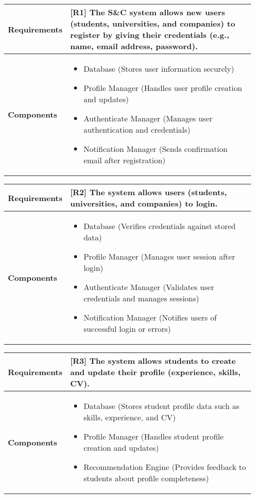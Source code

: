 \begin{table}[h!]
\centering
\begin{tabular}{|l|p{10cm}|}
\hline
\textbf{Requirements} & 
[R1] The S\&C system allows new users (students, universities, and companies) to register by giving
 their credentials (e.g., name, email address, password).\\
\hline
\textbf{Components} & 
\begin{itemize}
    \item Database (Stores user information securely)
    \item Profile Manager (Handles user profile creation and updates)
    \item Authenticate Manager (Manages user authentication and credentials)
    \item Notification Manager (Sends confirmation email after registration)
\end{itemize} \\
\hline
\end{tabular}
\label{tab:req_comp}
\end{table}

\begin{table}[h!]
\centering
\begin{tabular}{|l|p{10cm}|}
\hline
\textbf{Requirements} & 
[R2] The system allows users (students, universities, and companies) to login.\\
\hline
\textbf{Components} & 
\begin{itemize}
    \item Database (Verifies credentials against stored data)
    \item Profile Manager (Manages user session after login)
    \item Authenticate Manager (Validates user credentials and manages sessions)
    \item Notification Manager (Notifies users of successful login or errors)
\end{itemize} \\
\hline
\end{tabular}
\label{tab:req_comp}
\end{table}

\begin{table}[h!]
\centering
\begin{tabular}{|l|p{10cm}|}
\hline
\textbf{Requirements} & 
[R3] The system allows students to create and update their profile (experience, skills, CV).\\
\hline
\textbf{Components} & 
\begin{itemize}
    \item Database (Stores student profile data such as skills, experience, and CV)
    \item Profile Manager (Handles student profile creation and updates)
    \item Recommendation Engine (Provides feedback to students about profile completeness)
\end{itemize} \\
\hline
\end{tabular}
\label{tab:req_comp}
\end{table}

